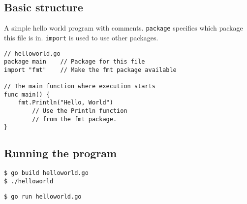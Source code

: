 \subsection{Basic structure}
A simple hello world program with comments.
\texttt{package} specifies which package this file is in.
\texttt{import} is used to use other packages.

\begin{lstlisting}
// helloworld.go
package main    // Package for this file
import "fmt"    // Make the fmt package available

// The main function where execution starts
func main() { 
  	fmt.Println("Hello, World") 
        // Use the Println function
        // from the fmt package.   
}
\end{lstlisting}
\subsection{Running the program}
\begin{lstlisting}
$ go build helloworld.go
$ ./helloworld
\end{lstlisting}

\begin{lstlisting}
$ go run helloworld.go
\end{lstlisting}
